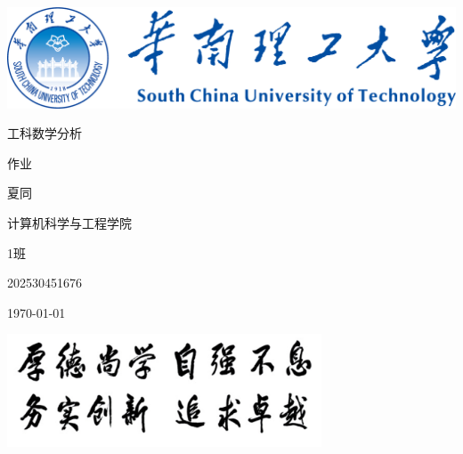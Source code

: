 \begin{titlepage}
    \centering
    \vspace*{0.5cm}
        \includegraphics[width=\textwidth]{flg/mylogo.png} %
    \par\vspace{1cm}
    {\fontsize{55}{55}\selectfont\songti 工科数学分析 \par}
    \vspace{0.1cm} %
    {\fontsize{65}{65}\selectfont\songti 作业 \par}
    \vspace{1cm} %
    {\Large {} 夏同 \par}
    \vspace{0.1cm}
    {\Large {} 计算机科学与工程学院 \par}
    \vspace{0.1cm}
    {\Large {} 1班 \par}
    \vspace{0.1cm}
    {\Large {} 202530451676 \par}
    \vspace{0.1cm}
    {\Large {} \today \par}
    \vspace{0.5cm}
        \includegraphics[width=0.7\textwidth]{flg/saying.png} %
    \par\vspace{1cm}
\end{titlepage}